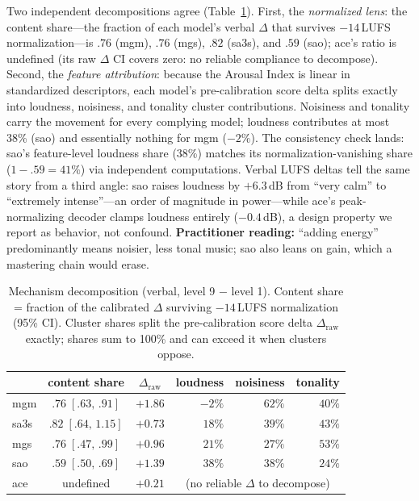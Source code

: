 \documentclass{article}
\newcommand{\ci}[2]{[#1,\,#2]}
\newcommand{\inst}{Arousal Index}
\begin{document}
Two independent decompositions agree (Table~\ref{tab:mech}). First, the
\emph{normalized lens}: the content share---the fraction of each model's
verbal $\Delta$ that survives $-14$\,LUFS normalization---is $.76$ (mgm),
$.76$ (mgs), $.82$ (sa3s), and $.59$ (sao); ace's ratio is undefined (its raw $\Delta$ CI covers zero: no reliable compliance to decompose).
Second, the \emph{feature attribution}: because the \inst{} is linear in
standardized descriptors, each model's pre-calibration score delta splits
exactly into loudness, noisiness, and tonality cluster contributions.
Noisiness and tonality carry the movement for every complying model;
loudness contributes at most 38\% (sao) and essentially nothing for mgm
($-2\%$). The consistency check lands: sao's feature-level loudness share
(38\%) matches its normalization-vanishing share ($1-.59=41\%$) via independent
computations. Verbal LUFS deltas tell the same story from
a third angle: sao raises loudness by $+6.3$\,dB from ``very calm'' to
``extremely intense''---an order of magnitude in power---while ace's
peak-normalizing decoder clamps loudness entirely ($-0.4$\,dB), a design
property we report as behavior, not confound. \textbf{Practitioner reading:} ``adding energy'' predominantly means
noisier, less tonal music; sao also leans on gain, which a mastering chain
would erase.

\begin{table}[!t]
  \caption{Mechanism decomposition (verbal, level 9 $-$ level 1). Content
  share = fraction of the calibrated $\Delta$ surviving $-14$\,LUFS
  normalization (95\% CI). Cluster shares split the pre-calibration score
  delta $\Delta_{\text{raw}}$ exactly; shares sum to 100\% and can exceed it
  when clusters oppose.}
  \label{tab:mech}
  \centering\small
  \small
  \setlength{\tabcolsep}{5pt}
  \begin{tabular}{lccrrr}
    \toprule
    & content share & $\Delta_{\text{raw}}$ & loudness & noisiness & tonality \\
    \midrule
    mgm  & $.76\;\ci{.63}{.91}$ & $+1.86$ & $-2\%$  & $62\%$ & $40\%$ \\
    sa3s & $.82\;\ci{.64}{1.15}$ & $+0.73$ & $18\%$ & $39\%$ & $43\%$ \\
    mgs  & $.76\;\ci{.47}{.99}$ & $+0.96$ & $21\%$ & $27\%$ & $53\%$ \\
    sao  & $.59\;\ci{.50}{.69}$ & $+1.39$ & $38\%$ & $38\%$ & $24\%$ \\
    ace  & undefined            & $+0.21$ & \multicolumn{3}{c}{(no reliable $\Delta$ to decompose)} \\
    \bottomrule
  \end{tabular}
\end{table}
\end{document}
